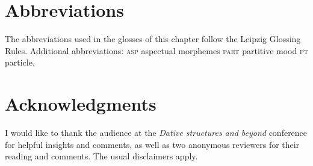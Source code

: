 \documentclass[output=paper,colorlinks,citecolor=brown,modfonts,nonflat]{langsci/langscibook}
\begin{document}
\section*{Abbreviations}
The abbreviations used in the glosses of this chapter follow the Leipzig Glossing Rules. Additional abbreviations:
\textsc{asp}  aspectual morphemes\hfill
\textsc{part}   partitive mood\hfill
\textsc{pt} particle.

\section*{Acknowledgments}
I would like to thank the audience at the \textit{Dative structures and beyond} conference for helpful insights and comments, as well as two anonymous reviewers for their reading and comments. The usual disclaimers apply.


\sloppy\printbibliography[heading=subbibliography,notkeyword=this]
\end{document}
